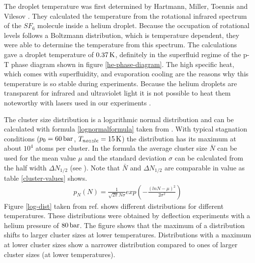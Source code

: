 \documentclass[parskip,12pt,headsepline,a4paper] {scrbook}
\begin{document}
The droplet temperature was first determined by Hartmann, Miller, Toennis and Vilesov \cite{he-tempNew}. They calculated the temperature from the rotational infrared spectrum of the $SF_6$ molecule inside a helium droplet. Because the occupation of rotational levels follows a Boltzmann distribution, which is temperature dependent, they were able to determine the temperature from this spectrum. The calculations gave a droplet temperature of $\unit[0.37]{K}$, definitely in the superfluid regime of the p-T phase diagram shown in figure \ref{he-phase-diagram}. The high specific heat, which comes with superfluidity, and evaporation cooling are the reasons why this temperature is so stable during experiments. Because the helium droplets are transparent for infrared and ultraviolet light it is not possible to heat them noteworthy with lasers used in our experiments \cite{laser-heating}.

The cluster size distribution is a logarithmic normal distribution and can be calculated with formula \ref{lognormalformula} taken from \cite{speed-distr}. With typical stagnation conditions ($p_0 = \unit[60]{bar}$, $T_{nozzle} = \unit[15]{K}$) the distribution has its maximum at about $10^4$ atoms per cluster. In the formula the average cluster size $\bar{N}$ can be used for the mean value $\mu$ and the standard deviation $\sigma$ can be calculated from the half width $\Delta N_{1/2}$ (see \cite{speed-distr}). Note that $\bar{N}$ and $\Delta N_{1/2}$ are comparable in value as table \ref{cluster-values} shows.
\begin{align}  \label{lognormalformula}
p_N(N) = \frac{1}{\sqrt{2\pi}N \sigma} exp\left(- \frac{(lnN - \mu)^2}{2\sigma^2}\right)
\end{align}
Figure \ref{log-dist} taken from ref. \cite{loga-distributions} shows different distributions for different temperatures. These distributions were obtained by deflection experiments with a helium pressure of $\unit[80]{bar}$. The figure shows that the maximum of a distribution shifts to larger cluster sizes at lower temperatures. Distributions with a maximum at lower cluster sizes show a narrower distribution compared to ones of larger cluster sizes (at lower temperatures).
\end{document}

